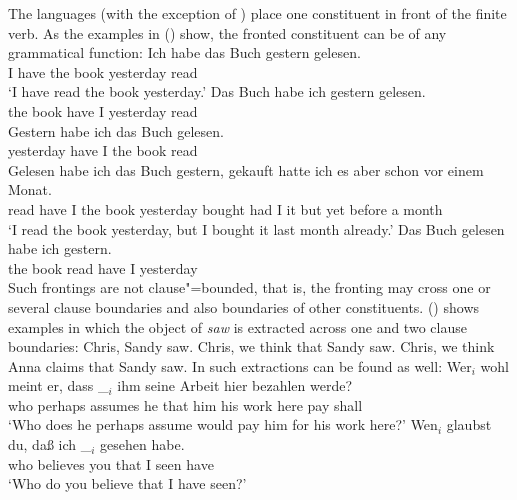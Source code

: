 The  languages (with the exception of ) place one constituent in front of the finite
verb. As the  examples in () show, the fronted constituent can be of any grammatical function:
\eal
\ex 
\gll Ich habe das Buch gestern gelesen.\\
     I have the book yesterday read\\\german
\glt `I have read the book yesterday.'
\ex 
\gll Das Buch habe ich gestern gelesen.\\
     the book have I yesterday read\\
\ex 
\gll Gestern habe ich das Buch gelesen.\\
     yesterday have I the book read\\
\ex 
\gll Gelesen habe ich das Buch gestern, gekauft hatte ich es aber schon vor einem Monat.\\
     read have I the book yesterday bought had I it but yet before a month\\
\glt `I read the book yesterday, but I bought it last month already.'
\ex 
\gll Das Buch gelesen habe ich gestern.\\
     the book read    have I yesterday\\
\zl
Such frontings are not clause"=bounded, that is, the fronting may cross one or several clause boundaries
and also boundaries of other constituents. () shows  examples in which the object of
\emph{saw} is extracted across one and two clause boundaries:
\eal
\ex\label{ex-chris-we-saw} Chris, Sandy saw.
\ex\label{ex-chris-we-think-that-sandy-saw} Chris, we think that Sandy saw.
\ex Chris, we think Anna claims that Sandy saw.
\zl
In  such extractions can be found as well:
\eal
\label{ex-fernabhaengigkeit-one}
\ex 
\gll Wer$_i$ wohl    meint   er, dass \_$_i$ ihm seine Arbeit hier bezahlen werde?\footnotemark\\
     who     perhaps assumes he  that {}     him his   work   here pay shall\\
\glt `Who does he perhaps assume would pay him for his work here?'
\ex
\label{ex-wen-glaubst-du-dass}
\gll Wen$_i$ glaubst du, daß ich \_$_i$ gesehen habe.\footnotemark\\
     who believes you that I {} seen have\\\german
{}
\glt `Who do you believe that I have seen?'
